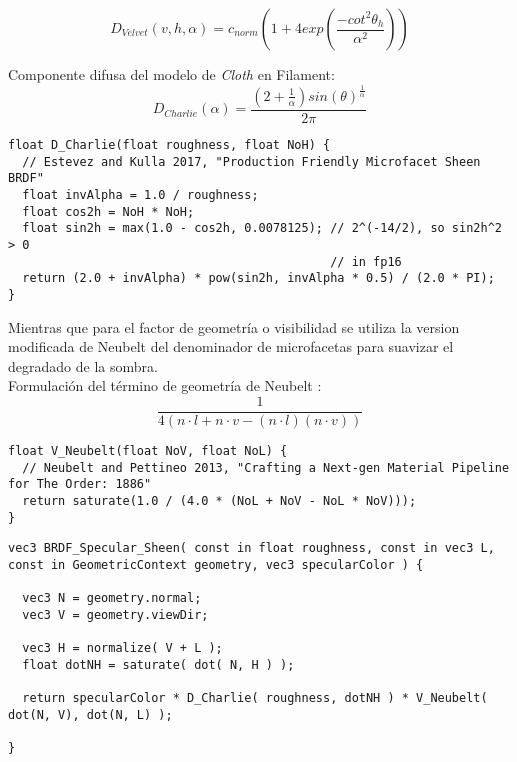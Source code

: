   \begin{equation}
    D_{Velvet}(v, h, \alpha) = c_{norm} (
      1 + 4exp \left(\frac{-cot^2\theta_h}{\alpha^2}\right)
    )
  \end{equation}
  \singlespacing

  Componente difusa del modelo de \textit{Cloth} en Filament:\\

  \begin{equation}
    D_{Charlie}(\alpha) = \frac
    {(2 + \frac{1}{\alpha})sin(\theta)^\frac{1}{\alpha}}
    {2\pi}
  \end{equation}
  \singlespacing

  \begin{lstlisting}[caption=Implementaci\'on del factor de distribuci\'on de Charlie en ThreeJs]
float D_Charlie(float roughness, float NoH) {
  // Estevez and Kulla 2017, "Production Friendly Microfacet Sheen BRDF"
  float invAlpha = 1.0 / roughness;
  float cos2h = NoH * NoH;
  float sin2h = max(1.0 - cos2h, 0.0078125); // 2^(-14/2), so sin2h^2 > 0
                                             // in fp16
  return (2.0 + invAlpha) * pow(sin2h, invAlpha * 0.5) / (2.0 * PI);
}
  \end{lstlisting}
  \singlespacing

  Mientras que para el factor de geometr\'ia o visibilidad se utiliza la version modificada de Neubelt \autocite{theorder}
  del denominador de microfacetas para suavizar el degradado de la sombra.\\

  Formulaci\'on del t\'ermino de geometr\'ia de Neubelt \autocite{theorder}:\\
    
  \begin{equation}
    \frac{1}{4(n\cdot{l} + n\cdot{v} - (n\cdot{l})(n\cdot{v}) )}
  \end{equation}
  \singlespacing

  \begin{lstlisting}[caption=Implementaci\'on del t\'ermino de de visibilidad de Neubelt \autocite{theorder}]
float V_Neubelt(float NoV, float NoL) {
  // Neubelt and Pettineo 2013, "Crafting a Next-gen Material Pipeline for The Order: 1886"
  return saturate(1.0 / (4.0 * (NoL + NoV - NoL * NoV)));
}
  \end{lstlisting}

  \singlespacing
  \begin{lstlisting}[caption=Cambios sobre la clase WebGLPrograms de ThreeJs]
vec3 BRDF_Specular_Sheen( const in float roughness, const in vec3 L, const in GeometricContext geometry, vec3 specularColor ) {

  vec3 N = geometry.normal;
  vec3 V = geometry.viewDir;

  vec3 H = normalize( V + L );
  float dotNH = saturate( dot( N, H ) );

  return specularColor * D_Charlie( roughness, dotNH ) * V_Neubelt( dot(N, V), dot(N, L) );

}
  \end{lstlisting}

